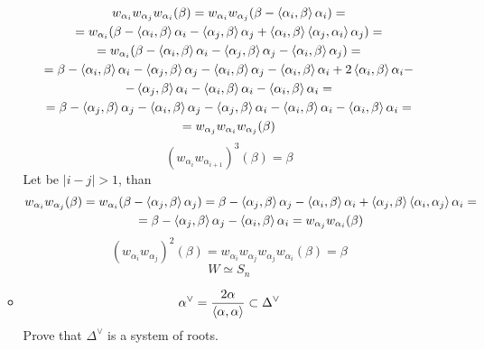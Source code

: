 \documentclass[12pt]{article}
\theoremstyle{definition}
\begin{document}
\begin{enumerate}
\begin{itemize}
\begin{multline}
            w_{\alpha_i}w_{\alpha_j}w_{\alpha_i}(\beta)=w_{\alpha_i}w_{\alpha_j}(\beta-\braket{\alpha_i,\beta}\alpha_i)=\\=w_{\alpha_i}(\beta-\braket{\alpha_i,\beta}\alpha_i-\braket{\alpha_j,\beta}\alpha_j+\braket{\alpha_i,\beta}\braket{\alpha_j,\alpha_i}\alpha_j)=\\=w_{\alpha_i}(\beta-\braket{\alpha_i,\beta}\alpha_i-\braket{\alpha_j,\beta}\alpha_j-\braket{\alpha_i,\beta}\alpha_j)=\\=\beta-\braket{\alpha_i,\beta}\alpha_i-\braket{\alpha_j,\beta}\alpha_j-\braket{\alpha_i,\beta}\alpha_j-\braket{\alpha_i,\beta}\alpha_i+2\braket{\alpha_i,\beta}\alpha_i-\\-\braket{\alpha_j,\beta}\alpha_i-\braket{\alpha_i,\beta}\alpha_i-\braket{\alpha_i,\beta}\alpha_i=\\=\beta-\braket{\alpha_j,\beta}\alpha_j-\braket{\alpha_i,\beta}\alpha_j-\braket{\alpha_j,\beta}\alpha_i-\braket{\alpha_i,\beta}\alpha_i-\braket{\alpha_i,\beta}\alpha_i=\\=w_{\alpha_j}w_{\alpha_i}w_{\alpha_j}(\beta)
        \end{multline}
        \begin{equation}
            (w_{\alpha_i}w_{\alpha_{i+1}})^3(\beta)=\beta
        \end{equation}
        Let be $|i-j|>1$, than
        \begin{multline}
            w_{\alpha_i}w_{\alpha_j}(\beta)=w_{\alpha_i}(\beta-\braket{\alpha_j,\beta}\alpha_j)=\beta-\braket{\alpha_j,\beta}\alpha_j-\braket{\alpha_i,\beta}\alpha_i+\braket{\alpha_j,\beta}\braket{\alpha_i,\alpha_j}\alpha_i=\\=\beta-\braket{\alpha_j,\beta}\alpha_j-\braket{\alpha_i,\beta}\alpha_i=w_{\alpha_j}w_{\alpha_i}(\beta)
        \end{multline}
        \begin{equation}
            (w_{\alpha_i}w_{\alpha_j})^2(\beta)=w_{\alpha_i}w_{\alpha_j}w_{\alpha_j}w_{\alpha_i}(\beta)=\beta
        \end{equation}
        \begin{equation}
            \boxed{W\simeq S_n}
        \end{equation}
        \item
        \begin{equation}
            \alpha^\vee=\frac{2\alpha}{\braket{\alpha,\alpha}}\subset\Delta^\vee
        \end{equation}
        Prove that $\Delta^\vee$ is a system of roots.

\end{itemize}
\end{enumerate}
\end{document}
